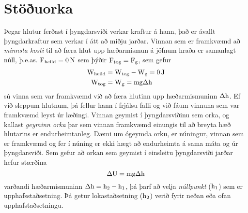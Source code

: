 \section{Stöðuorka}
Þegar hlutur ferðast í þyngdarsviði verkar kraftur á hann, það er ávallt
þyngdarkraftur sem verkar í átt að miðju jarðar. Vinnan sem er framkvæmd að 
\emph{minnsta kosti} til að færa hlut upp hæðarmismun á jöfnum hraða er samanlagt
núll, þ.e.as. $\uforce_\text{heild} = \SI{0}{\N}$ sem þýðir $\textrm{F}_\text{tog} = 
\textrm{F}_\text{g}$, sem gefur
\begin{align*}
	\uworkw_\text{heild} &= \uworkw_\text{tog} - \uworkw_\text{g} = \SI{0}{\J} \\
	\uworkw_\text{tog} &= \uworkw_\text{g} = \umass \uacceleg \Delta\ulengthh
\end{align*}
sú vinna sem var framkvæmd við að færa hlutinn upp hæðarmismuninn $\Delta\textrm{h}$. 
Ef við sleppum hlutnum, þá fellur hann í frjálsu falli og við fáum vinnuna sem var
framkvæmd leyst úr læðingi. Vinnan geymist í þyngdarsviðinu sem orka, og kallast
\emph{geyminn orka} þar sem vinnan framkvæmd einungis til að breyta hæð hlutarins
er endurheimtanleg. Dæmi um ógeymda orku, er núningur, vinnan sem er framkvæmd og
fer í núning er ekki hægt að endurheimta á sama máta og úr þyngdarsviði. Sem
gefur að orkan sem geymist í einsleitu þyngdarsviði jarðar hefur stærðina
\begin{equation}
	\Delta \textrm{U} = \textrm{m} \textrm{g} \Delta\textrm{h}
\end{equation}
varðandi hæðarmismuninn $\Delta\textrm{h} = \textrm{h}_2 - \textrm{h}_1$, þá
þarf að velja \emph{núllpunkt} ($\textrm{h}_1$) sem er upphafsstaðsetning. Þá 
getur lokastaðsetning ($\textrm{h}_2$) verið fyrir neðan eða ofan upphafstaðsetningu.


